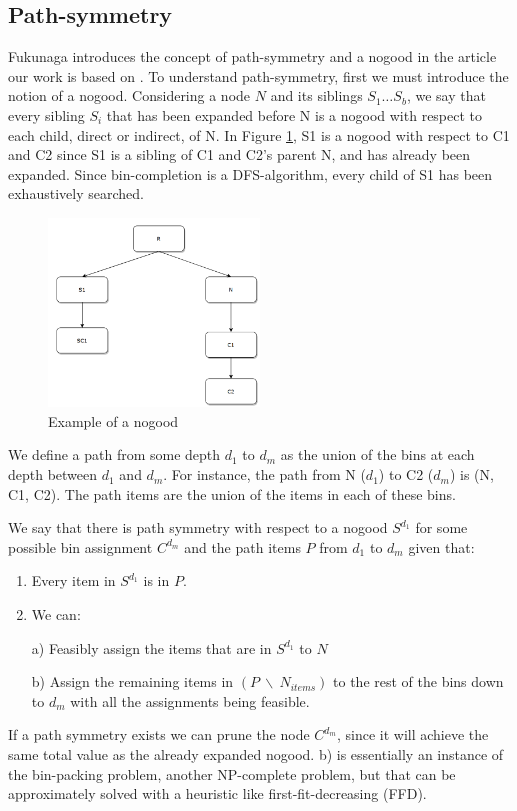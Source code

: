 \documentclass[b5paper]{article}
\begin{document}
\subsection{Path-symmetry}
Fukunaga introduces the concept of path-symmetry and a nogood in the article our work is based on \cite{fukunaga_branch-and-bound_2011}.
To understand path-symmetry, first we must introduce the notion of a nogood. Considering a node $N$ and its siblings $S_1 \ldots S_b$, we say that every sibling $S_i$ that has been expanded before N is a nogood with respect to each child, direct or indirect, of N.
In Figure \ref{fig:nogood}, S1 is a nogood with respect to C1 and C2 since S1 is a sibling of C1 and C2's parent N, and has already been expanded. Since bin-completion is a DFS-algorithm, every child of S1 has been exhaustively searched.
\\

\begin{figure}[h]
    \begin{center}
        \includegraphics[width=0.5\textwidth]{nogood.PNG}
        \caption{Example of a nogood}
        \label{fig:nogood}
    \end{center}
\end{figure}

We define a path from some depth $d_1$ to $d_m$ as the union of the bins at each depth between $d_1$ and $d_m$.
For instance, the path from N ($d_1$) to C2 ($d_m$) is (N, C1, C2). The path items are the union of the items in each of these bins.

We say that there is path symmetry with respect to a nogood $S^{d_1}$ for some possible bin assignment $C^{d_m}$ and the path items $P$ from $d_1$ to $d_m$ given that:
\begin{enumerate}
    \item Every item in $S^{d_1}$ is in $P$.
    \item We can:
    \item[a)]Feasibly assign the items that are in $S^{d_1}$ to $N$
    \item[b)] Assign the remaining items in $(P \: \backslash \: N_{items})$ to the rest of the bins down to $d_m$ with all the assignments being feasible.
\end{enumerate}
If a path symmetry exists we can prune the node $C^{d_m}$, since it will achieve the same total value as the already expanded nogood.
b) is essentially an instance of the bin-packing problem, another NP-complete problem, but that can be approximately solved with a heuristic like first-fit-decreasing (FFD). 
\end{document}
